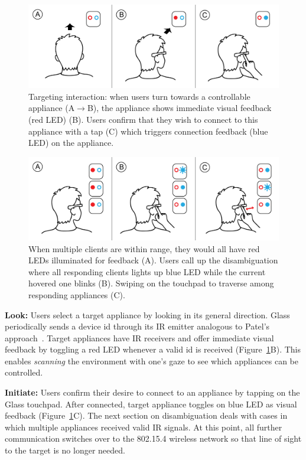 \begin{figure}[t!]
\centering
\includegraphics[width=\columnwidth]{figures/stepbystep.png}
\caption{Targeting interaction: when users turn towards a controllable appliance (A$\rightarrow$B), the appliance shows immediate visual feedback (red LED) (B). Users confirm that they wish to connect to this appliance with a tap (C) which triggers connection feedback (blue LED) on the appliance.}
\label{fig:interaction}
\end{figure}

\begin{figure}[t!]
\centering
\includegraphics[width=\columnwidth]{figures/stepbystep_multi.png}
\caption{When multiple clients are within range, they would all have red LEDs illuminated for feedback (A). Users call up the disambiguation where all responding clients lights up blue LED while the current hovered one blinks (B). Swiping on the touchpad to traverse among responding appliances (C).}
\label{fig:interaction_multi}
\end{figure}

{\bf Look:} Users select a target appliance by looking in its general direction.
Glass periodically sends a device id through its IR emitter analogous to Patel's approach~\cite{patel_2-way_2003}. Target appliances have IR receivers and offer immediate visual feedback by toggling a red LED whenever a valid id is received (Figure~\ref{fig:interaction}B). This enables {\em scanning} the environment with one's gaze to see which appliances can be controlled.

{\bf Initiate:} Users confirm their desire to connect to an appliance by tapping on the Glass touchpad. After connected, target appliance toggles on blue LED as visual feedback (Figure~\ref{fig:interaction}C). The next section on disambiguation deals with cases in which multiple appliances received valid IR signals. At this point, all further communication switches over to the 802.15.4 wireless network so that line of sight to the target is no longer needed.


